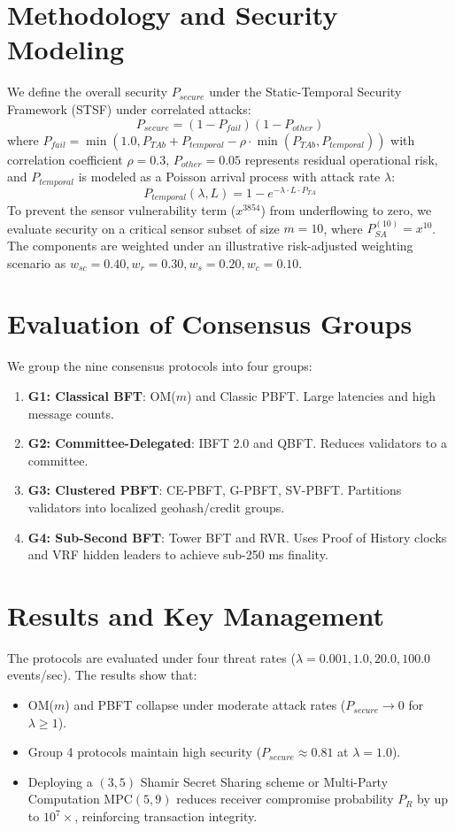 \documentclass[10pt,twocolumn,letterpaper]{article}
\begin{document}
\section{Methodology and Security Modeling}
We define the overall security $P_{secure}$ under the Static-Temporal Security Framework (STSF) under correlated attacks:
\begin{equation}
P_{secure} = (1 - P_{fail})(1 - P_{other})
\end{equation}
where $P_{fail} = \min(1.0, P_{TAb} + P_{temporal} - \rho \cdot \min(P_{TAb}, P_{temporal}))$ with correlation coefficient $\rho=0.3$, $P_{other} = 0.05$ represents residual operational risk, and $P_{temporal}$ is modeled as a Poisson arrival process with attack rate $\lambda$:
\begin{equation}
P_{temporal}(\lambda, L) = 1 - e^{-\lambda \cdot L \cdot P_{TA}}
\end{equation}
To prevent the sensor vulnerability term ($x^{3854}$) from underflowing to zero, we evaluate security on a critical sensor subset of size $m = 10$, where $P_{SA}^{(10)} = x^{10}$. The components are weighted under an illustrative risk-adjusted weighting scenario as $w_{sc} = 0.40, w_r = 0.30, w_s = 0.20, w_c = 0.10$.

\section{Evaluation of Consensus Groups}
We group the nine consensus protocols into four groups:
\begin{enumerate}
    \item \textbf{G1: Classical BFT}: OM($m$) and Classic PBFT. Large latencies and high message counts.
    \item \textbf{G2: Committee-Delegated}: IBFT 2.0 and QBFT. Reduces validators to a committee.
    \item \textbf{G3: Clustered PBFT}: CE-PBFT, G-PBFT, SV-PBFT. Partitions validators into localized geohash/credit groups.
    \item \textbf{G4: Sub-Second BFT}: Tower BFT and RVR. Uses Proof of History clocks and VRF hidden leaders to achieve sub-250 ms finality.
\end{enumerate}

\section{Results and Key Management}
The protocols are evaluated under four threat rates ($\lambda = 0.001, 1.0, 20.0, 100.0$ events/sec). The results show that:
\begin{itemize}
    \item OM($m$) and PBFT collapse under moderate attack rates ($P_{secure} \rightarrow 0$ for $\lambda \geq 1$).
    \item Group 4 protocols maintain high security ($P_{secure} \approx 0.81$ at $\lambda = 1.0$).
    \item Deploying a $(3,5)$ Shamir Secret Sharing scheme or Multi-Party Computation MPC$(5,9)$ reduces receiver compromise probability $P_R$ by up to $10^7\times$, reinforcing transaction integrity.
\end{itemize}
\end{document}

